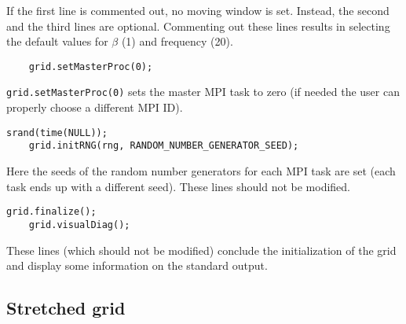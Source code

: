 \documentclass[11pt,a4paper]{report}
\begin{document}
If the first line is commented out, no moving window is set. Instead, the second and the third lines are optional. Commenting out these lines results in selecting the default values for $\beta$ (1) and frequency (20).
\begin{lstlisting}
	grid.setMasterProc(0);
\end{lstlisting}
\verb+grid.setMasterProc(0)+ sets the master MPI task to zero (if needed the user can properly choose a different MPI ID). 
\begin{lstlisting}[backgroundcolor=\color{no_modify}]
	srand(time(NULL));
	grid.initRNG(rng, RANDOM_NUMBER_GENERATOR_SEED);
\end{lstlisting}
Here the seeds of the random number generators for each MPI task are set (each task ends up with a different seed). These lines should not be modified.
\begin{lstlisting}[backgroundcolor=\color{no_modify}]
	grid.finalize();
	grid.visualDiag();
\end{lstlisting}
These lines (which should not be modified) conclude the initialization of the grid and display some information on the standard output.


\subsection{Stretched grid}\label{subsection_stretch}
\end{document}
